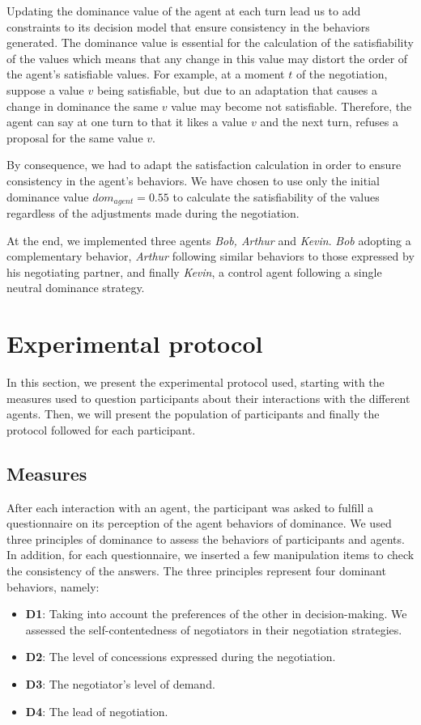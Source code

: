 \documentclass[10pt, a4paper]{article} %
\begin{document}
	Updating the dominance value of the agent at each turn lead us to add constraints to its decision model that ensure consistency in the behaviors generated. 
	The dominance value is essential for the calculation of the satisfiability of the values which means that any change in this value may distort the order of the agent's satisfiable values.
	For example, at a moment $t$ of the negotiation, suppose a value $v$ being satisfiable, but due to an adaptation that causes a change in dominance the same $v$ value may become not satisfiable. Therefore, the agent can say at one turn to that it likes a value $v$ and the next turn, refuses a proposal for the same value $v$.
	 
	By consequence, we had to adapt the satisfaction calculation in order to ensure consistency in the agent's behaviors. We have chosen to use only the initial dominance value $dom_{agent} = 0.55$ to calculate the satisfiability of the values regardless of the adjustments made during the negotiation.
	 
	At the end, we implemented three agents \emph{Bob, Arthur} and \emph{Kevin}. \emph{Bob} adopting a complementary behavior, \emph{Arthur} following similar behaviors to those expressed by his negotiating partner, and finally \emph{Kevin}, a control agent following a single neutral dominance strategy. 
	
	\section{Experimental protocol}
	\label{sec:procedure}
	In this section, we present the experimental protocol used, starting with the measures used to question participants about their interactions with the different agents. Then, we will present the population of participants and finally the protocol followed for each participant. 
	
	\subsection{Measures}
	After each interaction with an agent, the participant was asked to fulfill a questionnaire on its perception of the agent behaviors of dominance.
	We used three principles of dominance to assess the behaviors of participants and agents. In addition, for each questionnaire, we inserted a few manipulation items to check the consistency of the answers.  The three principles represent four dominant behaviors, namely:
	\begin{itemize}
		\item \textbf{D1}: Taking into account the preferences of the other in decision-making. We assessed the self-contentedness of negotiators in their negotiation strategies. 
		\item \textbf{D2}: The level of concessions expressed during the negotiation.
		\item \textbf{D3}: The negotiator's level of demand.
		\item \textbf{D4}: The lead of negotiation.
	\end{itemize}
	
\end{document}
